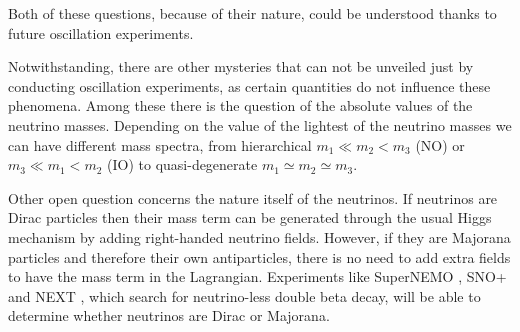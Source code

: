 Both of these questions, because of their nature, could be understood thanks to future oscillation experiments.

Notwithstanding, there are other mysteries that can not be unveiled just by conducting oscillation experiments, as certain quantities do not influence these phenomena. Among these there is the question of the absolute values of the neutrino masses. Depending on the value of the lightest of the neutrino masses we can have different mass spectra, from hierarchical $m_{1} \ll m_{2}<m_{3}$ (NO) or $m_{3} \ll m_{1}<m_{2}$ (IO) to quasi-degenerate $m_{1} \simeq m_{2} \simeq m_{3}$.

Other open question concerns the nature itself of the neutrinos. If neutrinos are Dirac particles then their mass term can be generated through the usual Higgs mechanism by adding right-handed neutrino fields. However, if they are Majorana particles and therefore their own antiparticles, there is no need to add extra fields to have the mass term in the Lagrangian. Experiments like SuperNEMO \cite{SuperNEMO2010}, SNO+ \cite{SNO2015} and NEXT \cite{NEXT2020}, which search for neutrino-less double beta decay, will be able to determine whether neutrinos are Dirac or Majorana.